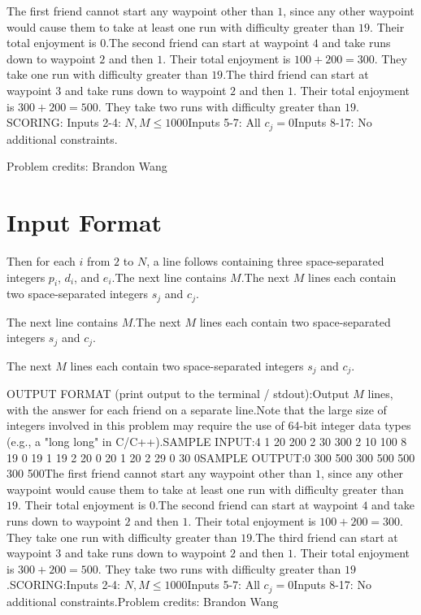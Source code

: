 \documentclass[12pt]{article}
\begin{document}
The first friend cannot start any waypoint other than $1$, since any other
waypoint would cause them to take at least one run with difficulty greater than
$19$. Their total enjoyment is $0$.The second friend can start at waypoint $4$ and take runs down to waypoint
$2$ and then $1$. Their total enjoyment is $100+200=300$. They take one run with
difficulty greater than $19$.The third friend can start at waypoint $3$ and take runs down to waypoint
$2$ and then $1$. Their total enjoyment is $300+200=500$. They take two runs with
difficulty greater than
$19$.
SCORING:
Inputs 2-4: $N, M\le 1000$Inputs 5-7: All $c_j=0$Inputs
8-17: No additional constraints.


Problem credits: Brandon Wang



\section*{Input Format}
Then for each $i$ from $2$ to $N$, a line follows containing three
space-separated integers $p_i$, $d_i$, and $e_i$.The next line contains $M$.The next $M$ lines each contain two space-separated integers $s_j$ and $c_j$.

The next line contains $M$.The next $M$ lines each contain two space-separated integers $s_j$ and $c_j$.

The next $M$ lines each contain two space-separated integers $s_j$ and $c_j$.

OUTPUT FORMAT (print output to the terminal / stdout):Output $M$ lines, with the answer for each friend on a separate line.Note that the large size of integers involved in this problem may require the
use of 64-bit integer data types (e.g., a "long long" in C/C++).SAMPLE INPUT:4
1 20 200
2 30 300
2 10 100
8
19 0
19 1
19 2
20 0
20 1
20 2
29 0
30 0SAMPLE OUTPUT:0
300
500
300
500
500
300
500The first friend cannot start any waypoint other than $1$, since any other
waypoint would cause them to take at least one run with difficulty greater than
$19$. Their total enjoyment is $0$.The second friend can start at waypoint $4$ and take runs down to waypoint
$2$ and then $1$. Their total enjoyment is $100+200=300$. They take one run with
difficulty greater than $19$.The third friend can start at waypoint $3$ and take runs down to waypoint
$2$ and then $1$. Their total enjoyment is $300+200=500$. They take two runs with
difficulty greater than
$19$.SCORING:Inputs 2-4: $N, M\le 1000$Inputs 5-7: All $c_j=0$Inputs
8-17: No additional constraints.Problem credits: Brandon Wang
\end{document}
